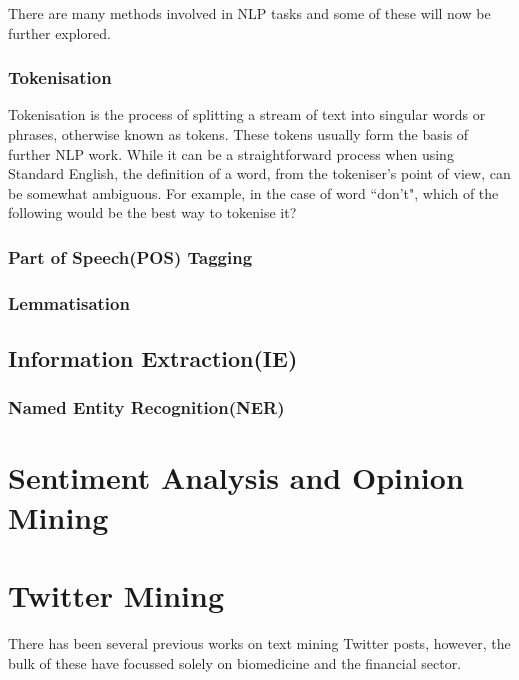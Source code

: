 There are many methods involved in NLP tasks and some of these will now be further explored.

\subsubsection{Tokenisation}
Tokenisation is the process of splitting a stream of text into singular words or phrases, otherwise known as tokens. These tokens usually form the basis of further NLP work. While it can be a straightforward process when using Standard English, the definition of a word, from the tokeniser's point of view, can be somewhat ambiguous. For example, in the case of word ``don't", which of the following would be the best way to tokenise it?

\begin{figure}[h!]
  
\end{figure}
\subsubsection{Part of Speech(POS) Tagging}

\subsubsection{Lemmatisation}


\subsection[Information Extraction]{Information Extraction(IE)}

\subsubsection{Named Entity Recognition(NER)}

\section[Sentiment Analysis]{Sentiment Analysis and Opinion Mining}

\section{Twitter Mining}
There has been several previous works on text mining Twitter posts, however, the bulk of these have focussed solely on biomedicine and the financial sector.


